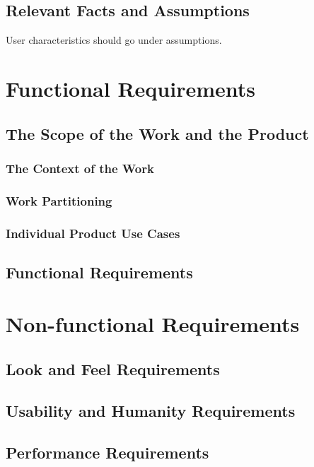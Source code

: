 \documentclass[12pt, titlepage]{article}
\begin{document}
\subsection{Relevant Facts and Assumptions}

User characteristics should go under assumptions.

\section{Functional Requirements}

\subsection{The Scope of the Work and the Product}

\subsubsection{The Context of the Work}

\subsubsection{Work Partitioning}

\subsubsection{Individual Product Use Cases}

\subsection{Functional Requirements}

\section{Non-functional Requirements}

\subsection{Look and Feel Requirements}

\subsection{Usability and Humanity Requirements}

\subsection{Performance Requirements}
\end{document}
